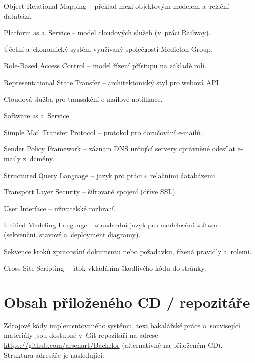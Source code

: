 \documentclass[
  a4paper,
  11pt,
  oneside,
  openany
]{report}
\begin{document}
\begin{description}[leftmargin=3.5cm, style=nextline]
  \item[ORM] Object-Relational Mapping -- překlad mezi objektovým modelem a~relační databází.
  \item[PaaS] Platform as a~Service -- model cloudových služeb (v~práci Railway).
  \item[Pohoda] Účetní a~ekonomický systém využívaný společností Medicton Group.
  \item[RBAC] Role-Based Access Control -- model řízení přístupu na základě rolí.
  \item[REST] Representational State Transfer -- architektonický styl pro webová API.
  \item[Resend] Cloudová služba pro transakční e-mailové notifikace.
  \item[SaaS] Software as a~Service.
  \item[SMTP] Simple Mail Transfer Protocol -- protokol pro doručování e-mailů.
  \item[SPF] Sender Policy Framework -- záznam DNS určující servery oprávněné odesílat e-maily z~domény.
  \item[SQL] Structured Query Language -- jazyk pro práci s~relačními databázemi.
  \item[TLS] Transport Layer Security -- šifrované spojení (dříve SSL).
  \item[UI] User Interface -- uživatelské rozhraní.
  \item[UML] Unified Modeling Language -- standardní jazyk pro modelování softwaru (sekvenční, stavové a~deployment diagramy).
  \item[Workflow] Sekvence kroků zpracování dokumentu nebo požadavku, řízená pravidly a~rolemi.
  \item[XSS] Cross-Site Scripting -- útok vkládáním škodlivého kódu do stránky.
\end{description}


\chapter{Obsah přiloženého CD / repozitáře}
\label{app:cd}

Zdrojové kódy implementovaného systému, text bakalářské práce a~související
materiály jsou dostupné v~Git repozitáři na adrese
\url{https://github.com/arsenart/Bachelor} (alternativně na přiloženém CD).
Struktura adresáře je následující:
\end{document}
